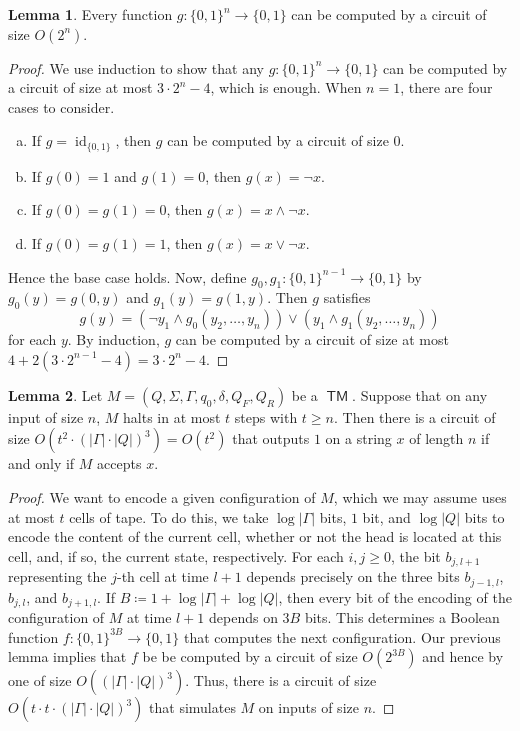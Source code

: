 \documentclass[10pt,letterpaper,cm]{nupset}
\theoremstyle{definition}
\newtheorem{lemma}{Lemma}
\newcommand{\1}{\mathbf{1}}
\newcommand{\0}{\vec 0}
\DeclareMathOperator{\id}{id}
\DeclareMathOperator{\TM}{\mathsf{TM}}
\begin{document}
\begin{lemma}
Every function $g: \{0,1\}^n \to \{0,1\}$ can be computed by a circuit of size $O(2^n)$. 
\end{lemma}
\begin{proof}
We use induction to show that any $g:\{0,1\}^n \to \{0,1\}$ can be computed by a circuit of size at most $3 \cdot 2^n -4$, which is enough. When $n=1$, there are four cases to consider.
\begin{enumerate}[(a)]
\item If $g= \id_{\{0,1\}}$, then $g$ can be computed by a circuit of size $0$.
\item If $g(0) =1$ and $g(1) =0$, then $g(x) = \neg x$.
\item If $g(0) = g(1) = 0$, then $g(x) = x \land \neg x$.
\item If $g(0) = g(1) = 1$, then $g(x) = x \vee \neg x$.
\end{enumerate}
Hence the base case holds. Now, define $g_0, g_1 : \{0,1 \}^{n-1} \to \{0,1\}$ by $g_0(y) = g(0, y)$ and $g_1(y) = g(1,y)$. Then $g$ satisfies $$g(y) = (\neg y_1 \land g_0(y_2, \ldots, y_n)) \vee (y_1 \land g_1(y_2, \ldots, y_n))$$ for each $y$. By induction, $g$ can be computed by a circuit of size at most $4 + 2(3 \cdot 2^{n-1} -4) = 3 \cdot 2^n -4$. 
\end{proof}

\begin{lemma}
Let $M= (Q, \Sigma, \Gamma, q_0, \delta, Q_F, Q_R)$ be a $\TM$. Suppose that on any input of size $n$, $M$ halts in at most $t$ steps with $t\geq n$. Then there is a circuit of size $O(t^2 \cdot (|\Gamma|\cdot |Q|)^3) = O(t^2)$ that  outputs $1$ on a  string $x$ of length $n$ if and only if $M$ accepts $x$.
\end{lemma}
\begin{proof}
We want to encode a given configuration of $M$, which we may assume uses at most $t$ cells of tape. To do this, we take $\log{|\Gamma|}$ bits, $1$ bit, and $\log{|Q|}$ bits to encode the content of the current cell, whether or not the head is located at this cell, and, if so, the current state, respectively.  For each $i,j\geq0$, the bit $b_{j, l+1}$ representing the $j$-th cell at time $l+1$ depends precisely on the three bits $b_{j-1, l}$, $b_{j, l}$, and $b_{j+1, l}$. If $B\coloneqq 1+ \log{|\Gamma|} +\log{|Q|}$, then every bit of the encoding of the configuration of $M$ at time $l+1$ depends on $3B$ bits. This determines a Boolean function $f: \{0,1\}^{3B}\to \{0,1\}$ that computes the next configuration. Our previous lemma implies that $f$ be be computed by a circuit of size $O(2^{3B})$ and hence by one of size $O((|\Gamma|\cdot |Q|)^3)$. Thus, there is a circuit of size $O(t\cdot t\cdot  (|\Gamma| \cdot |Q|)^3 )$ that simulates $M$ on inputs of size $n$.
\end{proof}
\end{document}
